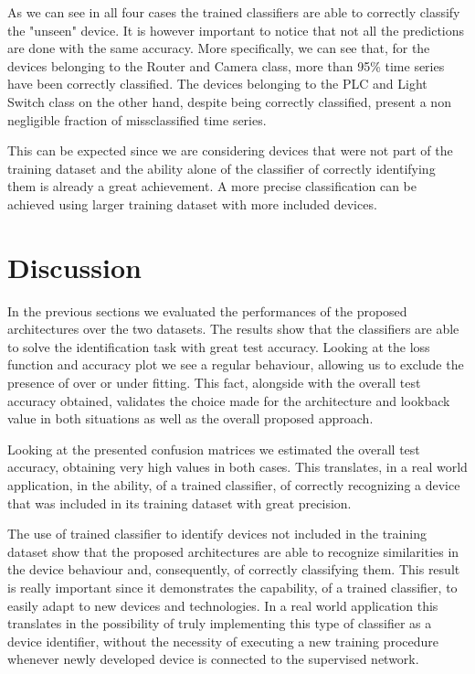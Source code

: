 As we can see in all four cases the trained classifiers are able to correctly classify the "unseen" device. It is however important to notice that not all the predictions are done with the same accuracy. More specifically, we can see that, for the devices belonging to the Router and Camera class, more than 95\% time series have been correctly classified. The devices belonging to the PLC and Light Switch class on the other hand, despite being correctly classified, present a non negligible fraction of missclassified time series.

This can be expected since we are considering devices that were not part of the training dataset and the ability alone of the classifier of correctly identifying them is already a great achievement. A more precise classification can be achieved using larger training dataset with more included devices.


\section{Discussion}

In the previous sections we evaluated the performances of the proposed architectures over the two datasets. The results show that the classifiers are able to solve the identification task with great test accuracy. Looking at the loss function and accuracy plot we see a regular behaviour, allowing us to exclude the presence of over or under fitting. This fact, alongside with the overall test accuracy obtained, validates the choice made for the architecture and lookback value in both situations as well as the overall proposed approach.

Looking at the presented confusion matrices we estimated the overall test accuracy, obtaining very high values in both cases. This translates, in a real world application, in the ability, of a trained classifier, of correctly recognizing a device that was included in its training dataset with great precision.

The use of trained classifier to identify devices not included in the training dataset show that the proposed architectures are able to recognize similarities in the device behaviour and, consequently, of correctly classifying them. This result is really important since it demonstrates the capability, of a trained classifier, to easily adapt to new devices and technologies. In a real world application this translates in the possibility of truly implementing this type of classifier as a device identifier, without the necessity of executing a new training procedure whenever newly developed device is connected to the supervised network.
